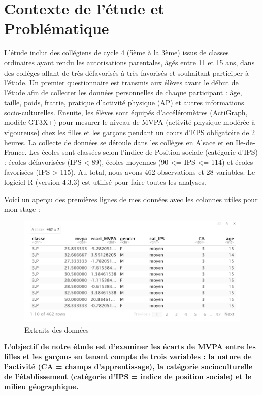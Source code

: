 \documentclass[12pt,a4paper]{article}
\begin{document}
	\section{Contexte de l'étude et Problématique}
	L’étude inclut des collégiens de cycle 4 (5ème à la 3ème) issus de classes ordinaires ayant rendu les autorisations parentales, âgés entre 11 et 15 ans, dans des collèges allant de très défavorisés à très favorisés et souhaitant participer à l’étude. Un premier questionnaire est transmis aux élèves avant le début de l'étude afin de collecter les données personnelles de chaque participant : âge, taille, poids, fratrie, pratique d’activité physique (AP) et autres informations socio-culturelles. Ensuite, les élèves sont équipés d'accéléromètres (ActiGraph, modèle GT3X+) pour mesurer le niveau de MVPA (activité physique modérée à vigoureuse) chez les filles et les garçons pendant un cours d'EPS obligatoire de 2 heures. La collecte de données se déroule dans les collèges en Alsace et en Ile-de-France. Les écoles sont classées selon l’indice de Position sociale (catégorie d'IPS) : écoles défavorisées (IPS < 89), écoles moyennes (90 <= IPS <= 114) et écoles favorisées (IPS > 115). Au total, nous avons 462 observations et 28 variables. Le logiciel R (version 4.3.3) est utilisé pour faire toutes les analyses.
	
	Voici un aperçu des premières lignes de mes données avec les colonnes utiles pour mon stage : 
	
	\begin{figure}[H]
		\centering
		\includegraphics[width=\linewidth]{Extrai_donnée.PNG}
		\caption{Extraits des données}
		\label{fig:image1}
	\end{figure}
	
	
	\textbf{L'objectif de notre étude est d'examiner les écarts de MVPA entre les filles et les garçons en tenant compte de trois variables : la nature de l'activité (CA = champs d'apprentissage), la catégorie socioculturelle de l'établissement (catégorie d'IPS = indice de position sociale) et le milieu géographique.}
	
\end{document}
